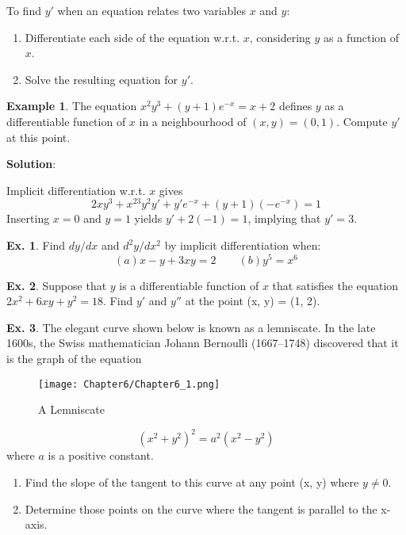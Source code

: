 \documentclass[10pt,a4paper]{book}
\theoremstyle{definition}\newtheorem{definition}{Definition}
\theoremstyle{definition}\newtheorem{fact}{Fact}
\theoremstyle{definition}\newtheorem{ex}{Ex.}
\theoremstyle{definition}\newtheorem{project}{Project}
\theoremstyle{definition}\newtheorem{problem}{Problem}
\theoremstyle{definition}\newtheorem{example}{Example}
\numberwithin{theorem}{chapter}
\numberwithin{corollary}{chapter}
\numberwithin{assumption}{chapter}
\numberwithin{definition}{chapter}
\numberwithin{prop}{chapter}
\numberwithin{notation}{chapter}
\numberwithin{problem}{chapter}
\numberwithin{example}{chapter}
\numberwithin{fact}{chapter}
\numberwithin{ex}{chapter}
\begin{document}
	To find $y'$ when an equation relates two variables $x$ and $y$:
	\begin{enumerate}[label=(\roman*)]
		\item Differentiate each side of the equation w.r.t. $x$, considering $y$ as a function of $x$.
		\item Solve the resulting equation for $y'$.
	\end{enumerate}
	
	\begin{example}
		The equation $x^2y^3 + (y + 1)e^{-x} = x + 2$ defines $y$ as a differentiable function of $x$ in a neighbourhood of $(x, y) = (0, 1)$. Compute $y'$ at this point.
		
		\textbf{Solution}:
		
		Implicit differentiation w.r.t. $x$ gives
		$$2xy^3 + x^23y^2y' + y'e^{-x} + (y + 1)(-e^{-x}) = 1 $$
		Inserting $x=0$ and $y=1$ yields $y' +2(-1)=1$, implying that $y' =3$.
	\end{example}
	
	\begin{ex}
		Find $dy/dx$ and $d^2y/dx^2$ by implicit differentiation when: 
		\begin{equation*}
			(a) x - y + 3xy = 2 \qquad
			(b) y^5=x^6
		\end{equation*}
	\end{ex}
	
	\begin{ex}
		Suppose that $y$ is a differentiable function of $x$ that satisfies the equation $2x^2 + 6xy + y^2 = 18$.
		Find $y'$ and $y''$ at the point (x, y) = (1, 2).
	\end{ex}
	
	\begin{ex}
		The elegant curve shown below is known as a lemniscate. In the late 1600s, the Swiss mathematician Johann Bernoulli (1667–1748) discovered that it is the graph of the equation
		\begin{figure}[H]
			\centering
			\texttt{[image: Chapter6/Chapter6\_1.png]}
			\caption{A Lemniscate}
		\end{figure}
		$$(x^2 + y^2)^2 = a^2(x^2 - y^2)$$
		where $a$ is a positive constant.
		\begin{enumerate}[label=(\alph*)]
			\item Find the slope of the tangent to this curve at any point (x, y) where $y \neq 0$.
			\item Determine those points on the curve where the tangent is parallel to the x-axis.
		\end{enumerate}
	\end{ex}
	
\end{document}

